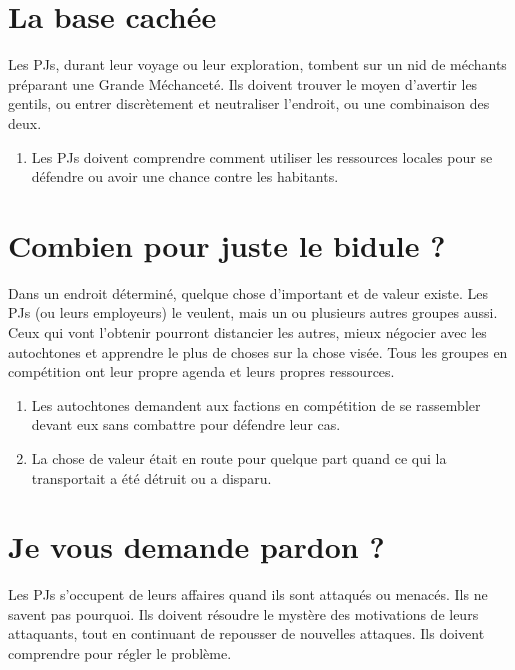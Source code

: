\begin{multicols}{2}
\section{La base cachée}
\label{base}


Les PJs, durant leur voyage ou leur exploration, tombent sur un nid de méchants préparant une Grande Méchanceté. Ils doivent trouver le moyen d'avertir les gentils, ou entrer discrètement et neutraliser l'endroit, ou une combinaison des deux.

\themes
\begin{enumerate}
\item Les PJs doivent comprendre comment utiliser les ressources locales pour se défendre ou avoir une chance contre les habitants.
\end{enumerate}

\section{Combien pour juste le bidule ?}
\label{bidule}


Dans un endroit déterminé, quelque chose d'important et de valeur existe. Les PJs (ou leurs employeurs) le veulent, mais un ou plusieurs autres groupes aussi. Ceux qui vont l'obtenir pourront distancier les autres, mieux négocier avec les autochtones et apprendre le plus de choses sur la chose visée. Tous les groupes en compétition ont leur propre agenda et leurs propres ressources.

\themes
\begin{enumerate}
\item Les autochtones demandent aux factions en compétition de se rassembler devant eux sans combattre pour défendre leur cas.
\item La chose de valeur était en route pour quelque part quand ce qui la transportait a été détruit ou a disparu.
\end{enumerate}

\section{Je vous demande pardon ?}
\label{pardon}


Les PJs s'occupent de leurs affaires quand ils sont attaqués ou menacés. Ils ne savent pas pourquoi. Ils doivent résoudre le mystère des motivations de leurs attaquants, tout en continuant de repousser de nouvelles attaques. Ils doivent comprendre pour régler le problème.


\end{multicols}
